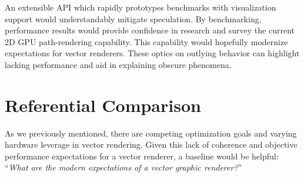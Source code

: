 An extensible API which rapidly prototypes benchmarks with visualization support would understandably mitigate speculation. By benchmarking, performance results would provide confidence in research and survey the current 2D GPU path-rendering capability. This capability would hopefully modernize expectations for vector renderers. These optics on outlying behavior can highlight lacking performance and aid in explaining obscure phenomena.

\section{Referential Comparison}\label{sec:referential_comparison}
As we previously mentioned, there are competing optimization goals and varying hardware leverage in vector rendering. Given this lack of coherence and objective performance expectations for a vector renderer, a baseline would be helpful: ``\textit{What \emph{are} the modern expectations of a vector graphic renderer?}''